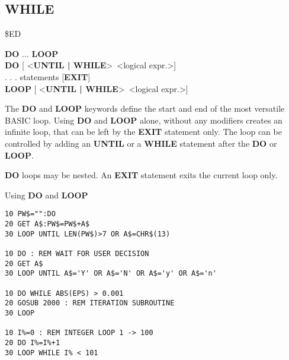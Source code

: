 \subsection{WHILE}
\begin{description}[leftmargin=2cm,style=nextline]
\item [Token:] \$ED
\item [Format:] {\bf DO} ... {\bf LOOP} \\
                {\bf DO} [ <{\bf UNTIL | WHILE}> <logical expr.>] \\
                . . . statements [{\bf EXIT}] \\
                {\bf LOOP} [ <{\bf UNTIL | WHILE}> <logical expr.>]
\item [Usage:] The {\bf DO} and {\bf LOOP} keywords define
               the start and end of the most versatile BASIC loop.
               Using {\bf DO} and {\bf LOOP} alone, without any
               modifiers creates an infinite loop, that can be left
               by the {\bf EXIT} statement only. The loop can be
               controlled by adding an {\bf UNTIL} or a {\bf WHILE}
               statement after the {\bf DO} or {\bf LOOP}.

\item [Remarks:] {\bf DO} loops may be nested. An {\bf EXIT} statement
               exits the current loop only.
\item [Example:] Using {\bf DO} and {\bf LOOP}
\begin{tcolorbox}[colback=black,coltext=white]
\verbatimfont{\codefont}
\begin{verbatim}
10 PW$="":DO
20 GET A$:PW$=PW$+A$
30 LOOP UNTIL LEN(PW$)>7 OR A$=CHR$(13)

10 DO : REM WAIT FOR USER DECISION
20 GET A$
30 LOOP UNTIL A$='Y' OR A$='N' OR A$='y' OR A$='n'

10 DO WHILE ABS(EPS) > 0.001
20 GOSUB 2000 : REM ITERATION SUBROUTINE
30 LOOP

10 I%
20 DO I%
30 LOOP WHILE I%
\end{verbatim}
\end{tcolorbox}
\end{description}


\newpage
